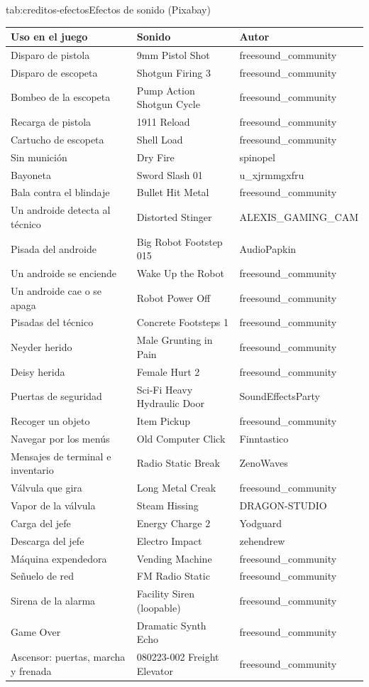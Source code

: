\begin{TablaAPA}{tab:creditos-efectos}{Efectos de sonido (Pixabay)}
\begin{tabularx}{\linewidth}{P{5.2cm}LP{4.3cm}}
\toprule
Uso en el juego & Sonido & Autor \\
\midrule
Disparo de pistola & 9mm Pistol Shot & freesound\_community \\
Disparo de escopeta & Shotgun Firing 3 & freesound\_community \\
Bombeo de la escopeta & Pump Action Shotgun Cycle & freesound\_community \\
Recarga de pistola & 1911 Reload & freesound\_community \\
Cartucho de escopeta & Shell Load & freesound\_community \\
Sin munición & Dry Fire & spinopel \\
Bayoneta & Sword Slash 01 & u\_xjrmmgxfru \\
Bala contra el blindaje & Bullet Hit Metal & freesound\_community \\
Un androide detecta al técnico & Distorted Stinger & ALEXIS\_GAMING\_CAM \\
Pisada del androide & Big Robot Footstep 015 & AudioPapkin \\
Un androide se enciende & Wake Up the Robot & freesound\_community \\
Un androide cae o se apaga & Robot Power Off & freesound\_community \\
Pisadas del técnico & Concrete Footsteps 1 & freesound\_community \\
Neyder herido & Male Grunting in Pain & freesound\_community \\
Deisy herida & Female Hurt 2 & freesound\_community \\
Puertas de seguridad & Sci-Fi Heavy Hydraulic Door & SoundEffectsParty \\
Recoger un objeto & Item Pickup & freesound\_community \\
Navegar por los menús & Old Computer Click & Finntastico \\
Mensajes de terminal e inventario & Radio Static Break & ZenoWaves \\
Válvula que gira & Long Metal Creak & freesound\_community \\
Vapor de la válvula & Steam Hissing & DRAGON-STUDIO \\
Carga del jefe & Energy Charge 2 & Yodguard \\
Descarga del jefe & Electro Impact & zehendrew \\
Máquina expendedora & Vending Machine & freesound\_community \\
Señuelo de red & FM Radio Static & freesound\_community \\
Sirena de la alarma & Facility Siren (loopable) & freesound\_community \\
Game Over & Dramatic Synth Echo & freesound\_community \\
Ascensor: puertas, marcha y frenada & 080223-002 Freight Elevator & freesound\_community \\
\bottomrule
\end{tabularx}
\end{TablaAPA}
